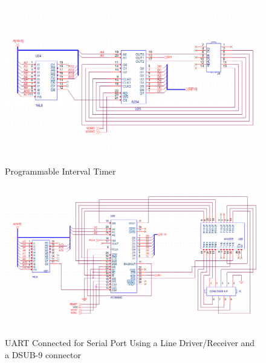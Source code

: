        \begin{figure}[ht]
            \begin{center}
                \includegraphics[width=1\textwidth]{figures/schematics/page7.png}
                \caption{Programmable Interval Timer} \label{fig:page7}
            \end{center}
        \end{figure}

        \begin{figure}[ht]
            \begin{center}
                \includegraphics[width=1\textwidth]{figures/schematics/page8.png}
                \caption{UART Connected for Serial Port Using a Line Driver/Receiver and a DSUB-9 connector} \label{fig:page8}
            \end{center}
        \end{figure}

